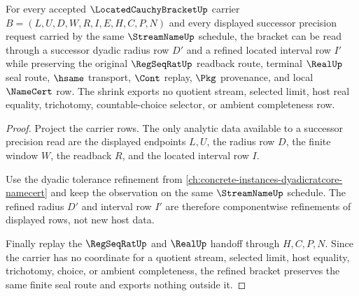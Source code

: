 \begin{theorem}
\label{thm:located-cauchy-bracket-shrink}
For every accepted $\LocatedCauchyBracketUp$ carrier $B=(L,U,D,W,R,I,E,H,C,P,N)$ and every displayed successor precision request carried by the same $\StreamNameUp$ schedule, the bracket can be read through a successor dyadic radius row $D'$ and a refined located interval row $I'$ while preserving the original $\RegSeqRatUp$ readback route, terminal $\RealUp$ seal route, $\hsame$ transport, $\Cont$ replay, $\Pkg$ provenance, and local $\NameCert$ row. The shrink exports no quotient stream, selected limit, host real equality, trichotomy, countable-choice selector, or ambient completeness row.
\end{theorem}
\begin{proof}
Project the carrier rows. The only analytic data available to a successor precision read are the displayed endpoints $L,U$, the radius row $D$, the finite window $W$, the readback $R$, and the located interval row $I$.

Use the dyadic tolerance refinement from \autoref{ch:concrete-instances-dyadicratcore-namecert} and keep the observation on the same $\StreamNameUp$ schedule. The refined radius $D'$ and interval row $I'$ are therefore componentwise refinements of displayed rows, not new host data.

Finally replay the $\RegSeqRatUp$ and $\RealUp$ handoff through $H,C,P,N$. Since the carrier has no coordinate for a quotient stream, selected limit, host equality, trichotomy, choice, or ambient completeness, the refined bracket preserves the same finite seal route and exports nothing outside it.
\end{proof}

